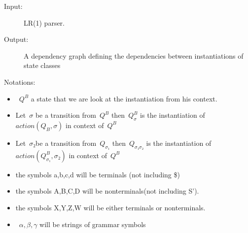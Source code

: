 \begin{description}
  \item [Input:] LR(1) parser.
  \item [Output:] A dependency graph defining the dependencies between
  instantiations of state classes
  \item [Notations:]
\end{description}
\begin{itemize}
  \item~$Q^B$ a state that we are look at the instantiation from his context.
  \item Let~$σ$ be a transition from~$Q^B$ then~$Q_σ^B$
        is the instantiation of~$action(Q_B,σ)$ in context
        of~$Q^B$
  \item Let~$σ₂$be a transition from~$Q_{σ₁}$ then~$Q_{σ₁σ₂}$
        is the instantiation of~$action(Q_{σ₁}^B,σ₂)$
        in context of~$Q^B$
  \item the symbols a,b,c,d will be terminals (not including \$)
  \item the symbols A,B,C,D will be nonterminals(not including S').
  \item the symbols X,Y,Z,W will be either terminals or nonterminals.
        \item~$α,β,γ$ will be strings of grammar symbols
\end{itemize}
